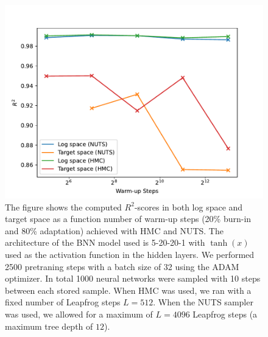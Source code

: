 \begin{figure}[H]
    \centering
    \includegraphics[scale=0.7]{figures/r2_scores/effect_of_burnin_r2_scores.pdf}
    \caption{
        The figure shows the computed $R^2$-scores in both log space and target space as a function number of warm-up steps (20\% burn-in and 80\% adaptation) achieved with HMC and NUTS. The architecture of the BNN model used is 5-20-20-1 with $\tanh(x)$ used as the activation function in the hidden layers. We performed 2500 pretraning steps with a batch size of 32 using the ADAM optimizer. In total 1000 neural networks were sampled with 10 steps between each stored sample. When HMC was used, we ran with a fixed number of Leapfrog steps $L = 512$. When the NUTS sampler was used, we allowed for a maximum of $L = 4096$ Leapfrog steps (a maximum tree depth of $12$).
    }
    \label{fig:r2_score_vs_burn_in_steps}
\end{figure}

